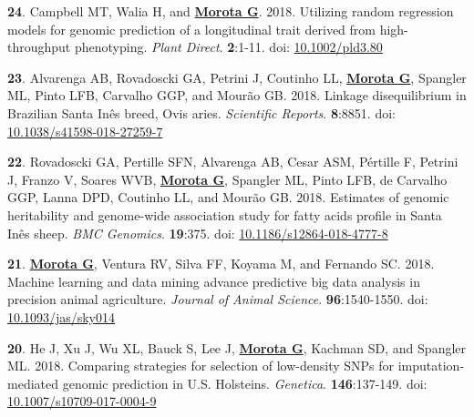 \documentclass[margin,line,10pt]{res}
\newenvironment{list1}{
  \begin{list}{\ding{113}}{%
      \setlength{\itemsep}{0in}
      \setlength{\parsep}{0in} \setlength{\parskip}{0in}
      \setlength{\topsep}{0in} \setlength{\partopsep}{0in} 
      \setlength{\leftmargin}{0.17in}}}{\end{list}}
\begin{document}
\begin{resume}
\begin{list1}
\item [{\bf 24}.] Campbell MT, Walia H, and \textbf{\underline{Morota G}}. 2018. Utilizing random regression models for genomic prediction of a longitudinal trait derived from high-throughput phenotyping. \emph{Plant Direct}. \textbf{2}:1-11. doi: \textcolor{blue}{\href{https://doi.org/10.1002/pld3.80}{10.1002/pld3.80}} 
  
  \vspace{0.5cm}

\item  [{\bf 23}.] Alvarenga AB, Rovadoscki GA, Petrini J, Coutinho LL, \textbf{\underline{Morota G}}, Spangler ML, Pinto LFB, Carvalho GGP, and Mour{\~a}o GB. 2018. Linkage disequilibrium in Brazilian Santa  In{\^e}s breed, Ovis aries. \emph{Scientific Reports}.  \textbf{8}:8851. doi: \textcolor{blue}{\href{https://doi.org/10.1038/s41598-018-27259-7}{10.1038/s41598-018-27259-7}} 

  \vspace{0.5cm}
  
\item  [{\bf 22}.] Rovadoscki GA, Pertille SFN, Alvarenga AB,  Cesar ASM, P{\'e}rtille F, Petrini J, Franzo V, Soares WVB, \textbf{\underline{Morota G}}, Spangler ML, Pinto LFB, de Carvalho GGP, Lanna DPD, Coutinho LL, and Mour{\~a}o GB. 2018. Estimates of genomic heritability and genome-wide association study for fatty acids profile in Santa In{\^e}s sheep. \emph{BMC Genomics}. \textbf{19}:375. doi: \textcolor{blue}{\href{https://doi.org/10.1186/s12864-018-4777-8}{10.1186/s12864-018-4777-8}} 
    
    \vspace{0.5cm}
    
\item  [{\bf 21}.] \textbf{\underline{Morota G}}, Ventura RV, Silva FF, Koyama M, and Fernando SC. 2018. Machine learning and data mining advance predictive big data analysis in precision animal agriculture. \emph{Journal of Animal Science}. \textbf{96}:1540-1550. doi: \textcolor{blue}{\href{http://dx.doi.org/10.1093/jas/sky014}{10.1093/jas/sky014}}

  \vspace{0.5cm}
  
\item  [{\bf 20}.] He J, Xu J, Wu XL, Bauck S, Lee J, \textbf{\underline{Morota G}}, Kachman SD, and Spangler ML. 2018. Comparing strategies for selection of low-density SNPs for imputation-mediated genomic prediction in U.S. Holsteins. \emph{Genetica}. \textbf{146}:137-149. doi: \textcolor{blue}{\href{https://dx.doi.org/10.1007/s10709-017-0004-9}{10.1007/s10709-017-0004-9}}


\end{list1}
\end{resume}
\end{document}

